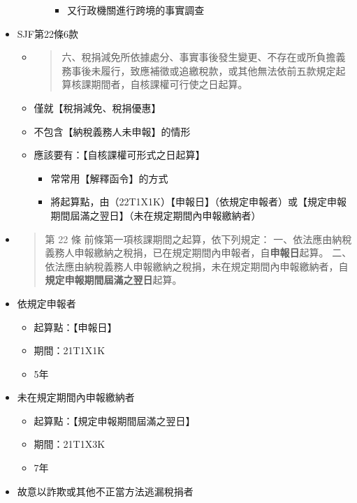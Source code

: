 \documentclass[]{ctexbook}
\providecommand{\tightlist}{%
  \setlength{\itemsep}{0pt}\setlength{\parskip}{0pt}}
\begin{document}
\begin{itemize}
\begin{itemize}
\begin{itemize}
      \begin{itemize}
      \tightlist
      \item
        又行政機關進行跨境的事實調查
      \end{itemize}
    \end{itemize}
  \end{itemize}
\item
  SJF第22條6款

  \begin{itemize}
  \item
    \begin{quote}
    六、稅捐減免所依據處分、事實事後發生變更、不存在或所負擔義務事後未履行，致應補徵或追繳稅款，或其他無法依前五款規定起算核課期間者，自核課權可行使之日起算。
    \end{quote}
  \item
    僅就【稅捐減免、稅捐優惠】
  \item
    不包含【納稅義務人未申報】的情形
  \item
    應該要有：【自核課權可形式之日起算】

    \begin{itemize}
    \tightlist
    \item
      常常用【解釋函令】的方式
    \item
      將起算點，由（22T1X1K）【申報日】（依規定申報者）或【規定申報期間屆滿之翌日】（未在規定期間內申報繳納者）
    \end{itemize}
  \end{itemize}
\item
  \begin{quote}
  第 22 條
  前條第一項核課期間之起算，依下列規定：
  一、依法應由納稅義務人申報繳納之稅捐，已在規定期間內申報者，自\textbf{申報日}起算。
  二、依法應由納稅義務人申報繳納之稅捐，未在規定期間內申報繳納者，自\textbf{規定申報期間屆滿之翌日}起算。
  \end{quote}
\item
  依規定申報者

  \begin{itemize}
  \tightlist
  \item
    起算點：【申報日】
  \item
    期間：21T1X1K
  \item
    5年
  \end{itemize}
\item
  未在規定期間內申報繳納者

  \begin{itemize}
  \tightlist
  \item
    起算點：【規定申報期間屆滿之翌日】
  \item
    期間：21T1X3K
  \item
    7年
  \end{itemize}
\item
  故意以詐欺或其他不正當方法逃漏稅捐者


\end{itemize}
\end{document}
